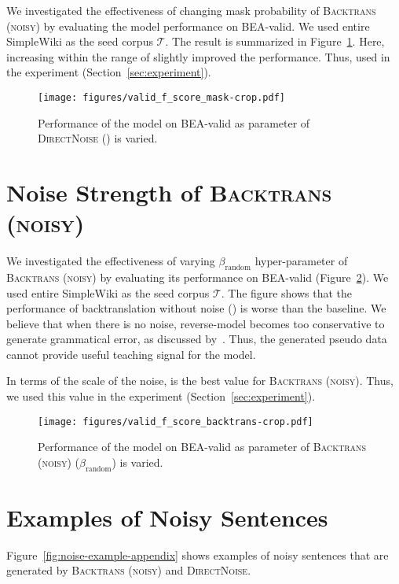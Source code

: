 \documentclass[11pt,a4paper]{article}
\newcommand{\betanoise}{\ensuremath{\beta_{\mathrm{random}}}}
\newcommand{\backtrans}{\textsc{Backtrans (noisy)}}
\newcommand{\directnoise}{\textsc{DirectNoise}}
\newcommand{\seedcorpus}{\ensuremath{\mathcal{T}}}
\begin{document}
We investigated the effectiveness of changing mask probability  of \backtrans{} by evaluating the model performance on BEA-valid.
We used entire SimpleWiki as the seed corpus \seedcorpus{}.
The result is summarized in Figure~\ref{fig:valid-f-score-mask}.
Here, increasing  within the range of  slightly improved the performance.
Thus, used  in the experiment (Section~\ref{sec:experiment}).

\begin{figure}[h]
  \center
  \texttt{[image: figures/valid\_f\_score\_mask-crop.pdf]}
  \caption{Performance of the model on BEA-valid as parameter of \directnoise{} () is varied.}
  \label{fig:valid-f-score-mask}
\end{figure}

\section{Noise Strength of \backtrans{}}
\label{appendix:noise-strength-of-backtrans}
We investigated the effectiveness of varying \betanoise{} hyper-parameter of \backtrans{} by evaluating its performance on BEA-valid (Figure~\ref{fig:valid-f-score-backtrans}).
We used entire SimpleWiki as the seed corpus \seedcorpus{}.
The figure shows that the performance of backtranslation without noise () is worse than the baseline.
We believe that when there is no noise, reverse-model becomes too conservative to generate grammatical error, as discussed by~\citet{xie:2018:NAACL}.
Thus, the generated pseudo data cannot provide useful teaching signal for the model.

In terms of the scale of the noise,  is the best value for \backtrans{}.
Thus, we used this value in the experiment (Section~\ref{sec:experiment}).

\begin{figure}[h]
  \center
  \texttt{[image: figures/valid\_f\_score\_backtrans-crop.pdf]}
  \caption{Performance of the model on BEA-valid as parameter of \backtrans{} (\betanoise{}) is varied.}
  \label{fig:valid-f-score-backtrans}
\end{figure}





\newpage
\section{Examples of Noisy Sentences}
Figure~\ref{fig:noise-example-appendix} shows examples of noisy sentences that are generated by \backtrans{} and \directnoise{}.
\end{document}
